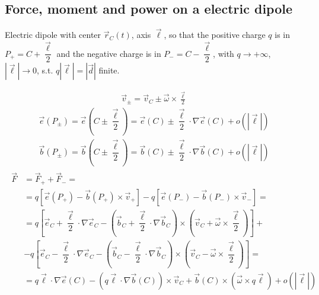 \documentclass[letterpaper,10pt,italian]{jupyterBook}
\begin{document}
\subsection{Force, moment and power on a electric dipole}
\label{\detokenize{ch/energy:force-moment-and-power-on-a-electric-dipole}}
\sphinxAtStartPar
Electric dipole with center \(\vec{r}_C(t)\), axis \(\vec{\ell}\), so that the positive charge \(q\) is in \(P_+ = C + \dfrac{\vec{\ell}}{2}\) and the negative charge is in \(P_- = C - \dfrac{\vec{\ell}}{2}\), with \(q \rightarrow +\infty\), \(|\vec{\ell}| \rightarrow 0\), s.t. \(q|\vec{\ell}| = |\vec{d}|\) finite.

\sphinxAtStartPar
{}
\begin{equation*}
\begin{split}\vec{v}_{\pm} = \vec{v}_C \pm \vec{\omega} \times \frac{\vec{\ell}}{2}\end{split}
\end{equation*}\begin{equation*}
\begin{split}\vec{e}(P_{\pm}) = \vec{e}\left( C \pm \dfrac{\vec{\ell}}{2} \right) = \vec{e}(C) \pm \dfrac{\vec{\ell}}{2} \cdot \nabla \vec{e}(C) + o(|\vec{\ell}|)\end{split}
\end{equation*}\begin{equation*}
\begin{split}\vec{b}(P_{\pm}) = \vec{b}\left( C \pm \dfrac{\vec{\ell}}{2} \right) = \vec{b}(C) \pm \dfrac{\vec{\ell}}{2} \cdot \nabla \vec{b}(C) + o(|\vec{\ell}|)\end{split}
\end{equation*}
\sphinxAtStartPar
{}
\begin{equation*}
\begin{split}\begin{aligned}
  \vec{F} & = \vec{F}_+ + \vec{F}_- = \\
   & = q \left[ \vec{e}(P_+) - \vec{b}(P_+) \times \vec{v}_{+} \right] - q \left[ \vec{e}(P_-) - \vec{b}(P_-) \times \vec{v}_{-} \right] = \\
   & = q \left[ \vec{e}_C + \dfrac{\vec{\ell}}{2} \cdot \nabla \vec{e}_C - \left( \vec{b}_C + \dfrac{\vec{\ell}}{2} \cdot \nabla \vec{b}_C \right) \times \left( \vec{v}_C + \vec{\omega} \times \dfrac{\vec{\ell}}{2} \right) \right] + \\ 
   & - q \left[ \vec{e}_C - \dfrac{\vec{\ell}}{2} \cdot \nabla \vec{e}_C - \left( \vec{b}_C - \dfrac{\vec{\ell}}{2} \cdot \nabla \vec{b}_C \right) \times \left( \vec{v}_C - \vec{\omega} \times \dfrac{\vec{\ell}}{2} \right) \right] = \\
   & = q \vec{\ell} \cdot \nabla \vec{e}(C) - \left( q \vec{\ell} \cdot \nabla \vec{b}(C) \right) \times \vec{v}_C + \vec{b}(C) \times \left(  \vec{\omega} \times q \vec{\ell} \right) + o(|\vec{\ell}|)
\end{aligned}\end{split}
\end{equation*}
\end{document}
